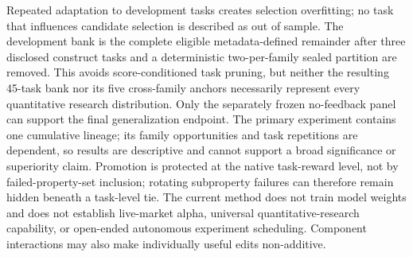 Repeated adaptation to development tasks creates selection overfitting; no
task that influences candidate selection is described as out of sample. The
development bank is the complete eligible metadata-defined remainder after
three disclosed construct tasks and a deterministic two-per-family sealed
partition are removed. This avoids score-conditioned task pruning, but neither
the resulting 45-task bank nor its five cross-family anchors necessarily
represent every quantitative research distribution. Only the separately
frozen no-feedback panel can support the final generalization endpoint. The
primary experiment contains one cumulative lineage; its family opportunities
and task repetitions are dependent, so results are descriptive and cannot
support a broad significance or superiority claim. Promotion is protected at
the native task-reward level, not by failed-property-set inclusion; rotating
subproperty failures can therefore remain hidden beneath a task-level tie. The
current method does not train model weights and does not establish live-market
alpha, universal quantitative-research capability, or open-ended autonomous
experiment scheduling. Component interactions may also make individually
useful edits non-additive.
